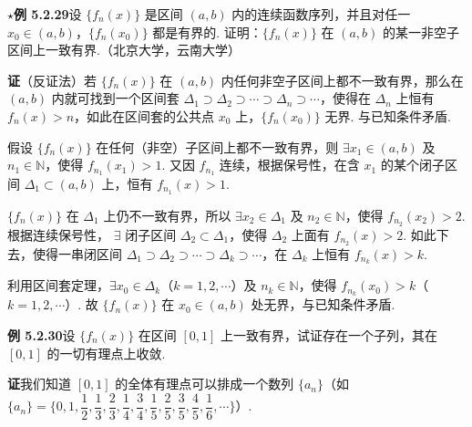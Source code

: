 \documentclass[UTF8, 12pt, fontset=fandol, oneside]{ctexart}
\begin{document}
\noindent\textbf{$\star$例 5.2.29}\quad 设 $\{f_n(x)\}$ 是区间 $(a,b)$ 内的连续函数序列，并且对任一
$x_0\in(a,b)$，$\{f_n(x_0)\}$ 都是有界的. 证明：$\{f_n(x)\}$ 在 $(a,b)$ 的某一非空子区间上一致有界.（北京大学，云南大学）

\noindent\textbf{证}\quad （反证法）若 $\{f_n(x)\}$ 在 $(a,b)$ 内任何非空子区间上都不一致有界，那么在
$(a,b)$ 内就可找到一个区间套
$\Delta_1\supset\Delta_2\supset\cdots\supset\Delta_n\supset\cdots$，使得在
$\Delta_n$ 上恒有 $f_n(x)>n$，如此在区间套的公共点 $x_0$ 上，$\{f_n(x_0)\}$ 无界. 与已知条件矛盾.

假设 $\{f_n(x)\}$ 在任何（非空）子区间上都不一致有界，则
$\exists x_1\in(a,b)$ 及 $n_1\in\mathbb N$，使得 $f_{n_1}(x_1)>1$. 又因
$f_{n_1}$ 连续，根据保号性，在含 $x_1$ 的某个闭子区间 $\Delta_1\subset(a,b)$ 上，恒有
$f_{n_1}(x)>1$.

$\{f_n(x)\}$ 在 $\Delta_1$ 上仍不一致有界，所以
$\exists x_2\in\Delta_1$ 及 $n_2\in\mathbb N$，使得 $f_{n_2}(x_2)>2$. 根据连续保号性，
$\exists$ 闭子区间 $\Delta_2\subset\Delta_1$，使得 $\Delta_2$ 上面有
$f_{n_2}(x)>2$. 如此下去，使得一串闭区间
$\Delta_1\supset\Delta_2\supset\cdots\supset\Delta_k\supset\cdots$，在
$\Delta_k$ 上恒有 $f_{n_k}(x)>k$.

利用区间套定理，$\exists x_0\in\Delta_k$（$k=1,2,\cdots$）及 $n_k\in\mathbb N$，使得
$f_{n_k}(x_0)>k$（$k=1,2,\cdots$）. 故 $\{f_n(x)\}$ 在 $x_0\in(a,b)$ 处无界，与已知条件矛盾.

\noindent\textbf{例 5.2.30}\quad 设 $\{f_n(x)\}$ 在区间 $[0,1]$ 上一致有界，试证存在一个子列，其在
$[0,1]$ 的一切有理点上收敛.

\noindent\textbf{证}\quad 我们知道 $[0,1]$ 的全体有理点可以排成一个数列 $\{a_n\}$（如
$\{a_n\}=\{0,1,\dfrac12,\dfrac13,\dfrac23,\dfrac14,\dfrac34,\dfrac15,\dfrac25,\dfrac35,\dfrac45,\dfrac16,\cdots\}$）.
\end{document}
